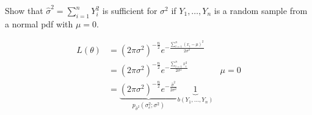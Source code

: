 \begin{problem}
   Show that ${\hat{\sigma}^2 = \sum_{i=1}^{n} Y_i^2}$ is sufficient for $\sigma^2$ if ${Y_1,\ldots,Y_n}$ is a random sample from a normal pdf with ${\mu = 0}$.
\end{problem}

\begin{align}
  L(\theta) &= \left(2\pi\sigma^2\right)^{-\frac{n}{2}} e^{-\frac{\sum_{i=1}^{n} (x_i - \mu)^2}{2\sigma^2}} \\
            &= \left(2\pi\sigma^2\right)^{-\frac{n}{2}} e^{-\frac{\sum_{i=1}^{n} x_{i}^{2}}{2\sigma^2}} & \mu = 0 \\
            &= \underbrace{\left(2\pi\sigma^2\right)^{-\frac{n}{2}} e^{-\frac{\hat{\sigma}^2}{2\sigma^2}}}_{p_{\hat{\sigma}^2}(\sigma^{2}_e;\sigma^2)} \underbrace{1}_{b(Y_1,\ldots,Y_n)}
\end{align}
